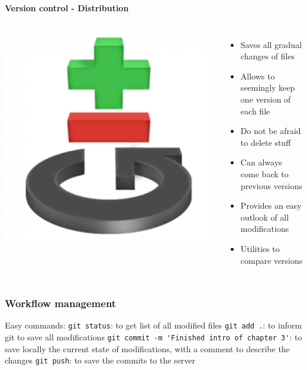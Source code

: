 \documentclass[9pt,xcolor=pdftex,dvipsnames,table]{beamer}
\begin{document}
\begin{frame}{\textbf{Version control - Distribution}}
\begin{columns}
\centering
\includegraphics[width=1\textwidth]{images/git-logo.png}
\begin{itemize}
\item Saves all gradual changes of files
\item Allows to seemingly keep one version of each file
\item Do not be afraid to delete stuff
\item Can always come back to previous versions
\item Provides an easy outlook of all modifications
\item Utilities to compare versions
\end{itemize}
\end{columns}
\end{frame}


\begin{frame}[fragile] %
\frametitle{\textbf{Workflow management}}
Easy commands:
\verb=git status=: to get list of all modified files
\verb=git add .=: to inform git to save all modifications
\verb=git commit -m 'Finished intro of chapter 3'=: to save locally the
current state of modifications, with a comment to describe the changes
\verb=git push=: to save the commits to the server
\end{frame}
\end{document}
